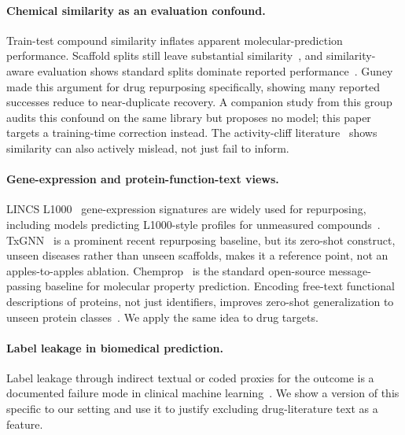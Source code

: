 \documentclass{llncs}
\begin{document}
\paragraph{Chemical similarity as an evaluation confound.}
Train-test compound similarity inflates apparent molecular-prediction performance. Scaffold splits still leave substantial similarity~\cite{scaffoldsplits2024}, and similarity-aware evaluation shows standard splits dominate reported performance~\cite{similarityaware2025}. Guney~\cite{guney2017reproducible} made this argument for drug repurposing specifically, showing many reported successes reduce to near-duplicate recovery. A companion study from this group~\cite{kondadadi2026ichiaudit} audits this confound on the same library but proposes no model; this paper targets a training-time correction instead. The activity-cliff literature~\cite{vantilborg2022activitycliffs} shows similarity can also actively mislead, not just fail to inform.
\paragraph{Gene-expression and protein-function-text views.}
LINCS L1000~\cite{subramanian2017l1000} gene-expression signatures are widely used for repurposing, including models predicting L1000-style profiles for unmeasured compounds~\cite{pham2021deepce}. TxGNN~\cite{huang2024txgnn} is a prominent recent repurposing baseline, but its zero-shot construct, unseen diseases rather than unseen scaffolds, makes it a reference point, not an apples-to-apples ablation. Chemprop~\cite{yang2019chemprop,heid2024chemprop} is the standard open-source message-passing baseline for molecular property prediction. Encoding free-text functional descriptions of proteins, not just identifiers, improves zero-shot generalization to unseen protein classes~\cite{stargo2025,deepgozero2022}. We apply the same idea to drug targets.

\paragraph{Label leakage in biomedical prediction.}
Label leakage through indirect textual or coded proxies for the outcome is a documented failure mode in clinical machine learning~\cite{labelleakage2023jamia,labelleakage2025jama}. We show a version of this specific to our setting and use it to justify excluding drug-literature text as a feature.
\end{document}
